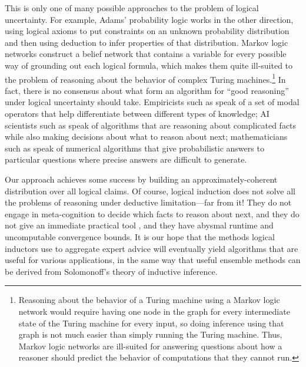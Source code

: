 \documentclass[authordate,onecolumn,noenvironments]{miri-tech-article}
\numberwithin{equation}{subsection}
\begin{document}
This is only one of many possible approaches to the problem of logical uncertainty. For example, Adams' probability logic \citeyearpar{adams1996primer} works in the other direction, using logical axioms to put constraints on an unknown probability distribution and then using deduction to infer properties of that distribution. Markov logic networks \citep{Richardson:2006} construct a belief network that contains a variable for every possible way of grounding out each logical formula, which makes them quite ill-suited to the problem of reasoning about the behavior of complex Turing machines.\footnote{Reasoning about the behavior of a Turing machine using a Markov logic network would require having one node in the graph for every intermediate state of the Turing machine for every input, so doing inference using that graph is not much easier than simply running the Turing machine. Thus, Markov logic networks are ill-suited for answering questions about how a reasoner should predict the behavior of computations that they cannot run.} In fact, there is no consensus about what form an algorithm for ``good reasoning'' under logical uncertainty should take. Empiricists such as \citet{Hintikka:1962:knowledge,Fagin:1995:knowledge} speak of a set of modal operators that help differentiate between different types of knowledge; AI scientists such as \citet{russell1991principles,Hay:2012:Selecting,lin2015metareasoning} speak of algorithms that are reasoning about complicated facts while also making decisions about what to reason about next; mathematicians such as \citep{briol2015probabilistic,briol2015frank,hennig2015probabilistic} speak of numerical algorithms that give probabilistic answers to particular questions where precise answers are difficult to generate.

Our approach achieves some success by building an approximately-coherent distribution over all logical claims. Of course, logical induction does not solve all the problems of reasoning under deductive limitation---far from it! They do not engage in meta-cognition  to decide which facts to reason about next, and they do not give an immediate practical tool , and they have abysmal runtime and uncomputable convergence bounds. It is our hope that the methods logical inductors use to aggregate expert advice will eventually yield algorithms that are useful for various applications, in the same way that useful ensemble methods can be derived from Solomonoff's theory of inductive inference.
\end{document}
